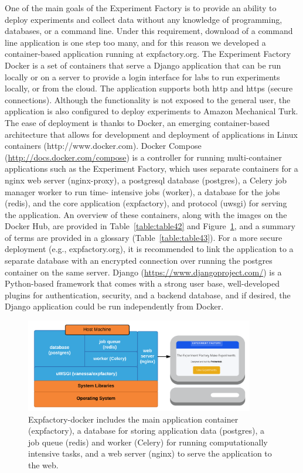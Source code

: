 \documentclass{report}
\begin{document}
One of the main goals of the Experiment Factory is to provide an ability
to deploy experiments and collect data without any knowledge of
programming, databases, or a command line. Under this requirement,
download of a command line application is one step too many, and for
this reason we developed a container-based application running at
expfactory.org. The Experiment Factory Docker is a set of containers
that serve a Django application that can be run locally or on a server
to provide a login interface for labs to run experiments locally, or
from the cloud. The application supports both http and https (secure
connections). Although the functionality is not exposed to the general
user, the application is also configured to deploy experiments to Amazon
Mechanical Turk. The ease of deployment is thanks to Docker, an emerging
container-based architecture that allows for development and deployment
of applications in Linux containers (http://www.docker.com). Docker
Compose (\href{http://docs.docker.com/compose}{http://docs.docker.com/compose}) is a controller for running
multi-container applications such as the Experiment Factory, which uses
separate containers for a nginx web server (nginx-proxy), a postgresql
database (postgres), a Celery job manager worker to run time- intensive
jobs (worker), a database for the jobs (redis), and the core application
(expfactory), and protocol (uwsgi) for serving the application. An
overview of these containers, along with the images on the Docker Hub,
are provided in Table~\ref{table:table42} and Figure~\ref{fig:42}, and a summary of terms are
provided in a glossary (Table~\ref{table:table43}). For a more secure deployment (e.g.,
expfactory.org), it is recommended to link the application to a separate
database with an encrypted connection over running the postgres
container on the same server. Django (\href{https://www.djangoproject.com/}{https://www.djangoproject.com/}) is
a Python-based framework that comes with a strong user base,
well-developed plugins for authentication, security, and a backend
database, and if desired, the Django application could be run
independently from Docker.

\begin{figure}[ht!]
\begin{center}
\includegraphics[width=10cm]{images/figure42.png}
\end{center}
\caption{ \label{fig:42} Expfactory-docker includes the main application container (expfactory), a database for storing application data (postgres), a job queue (redis) and worker (Celery) for running computationally intensive tasks, and a web server (nginx) to serve the application to the web. \newline \newline}
\end{figure} 
\end{document}
